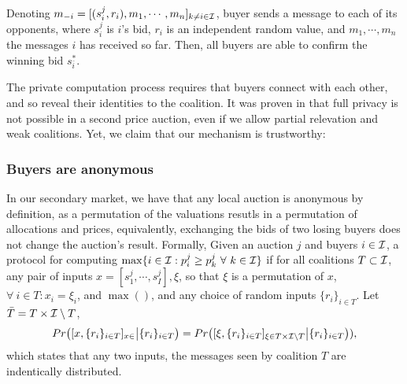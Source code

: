 Denoting $m_{-i} = [(s_i^j, r_i), m_1, \cdots, m_n]_{k\ne i\in \mathcal{I}}$, buyer sends a
message to each of its opponents, where $s_i^j$ is $i$'s bid, $r_i$
is an independent random value, and $m_1, \cdots, m_n$ the messages $i$ has
received so far.
Then, all buyers are able to confirm the winning bid $s_{\bar{i}}^*$. 

The
private computation process requires that buyers connect with each other, and
so reveal their identities to the coalition. It was proven in \cite{felix} that full privacy is not possible in a second
price auction, even if we allow partial relevation and weak coalitions. Yet, we
claim that our mechanism is trustworthy:

\subsubsection{Buyers are anonymous}
In our secondary market, we have that any local auction is anonymous by definition, as a permutation of
the valuations resutls in a permutation of allocations and prices, equivalently,
exchanging the bids of two losing buyers does not change the auction's result.
Formally,
 \cite{felix}
Given an auction $j$ and buyers $i\in\mathcal{I}$, a protocol for computing
$\max\lbrace i \in\mathcal{I} : p_i^j \ge p_k^j \ \forall \ k\in\mathcal{I}\rbrace$ if for
all coalitions $T\subset \mathcal{I}$, any pair of inputs $x = [s_1^j, \cdots,
s_I^j], \xi$, so that $\xi$ is a permutation of $x$, $\forall \ i \in T : x_i =
\xi_i$, and $\max( )$, and any choice of random inputs $\lbrace
r_i\rbrace_{i\in T}$. Let $\bar{T} =   T \times \mathcal{I} \setminus T$, 
$$
    Pr\big([x, \lbrace r_i\rbrace_{i\in T}]_{x\in}
    \big\vert
    \lbrace r_i\rbrace_{i\in T}\big) = Pr\big([\xi, \lbrace r_i\rbrace_{i\in T}]_{\xi\in T
    \times \mathcal{I} \setminus T}\big\vert
    \lbrace r_i\rbrace_{i\in T}\big)),
$$
which states that any two inputs, the messages seen by coalition $T$
are indentically distributed.

